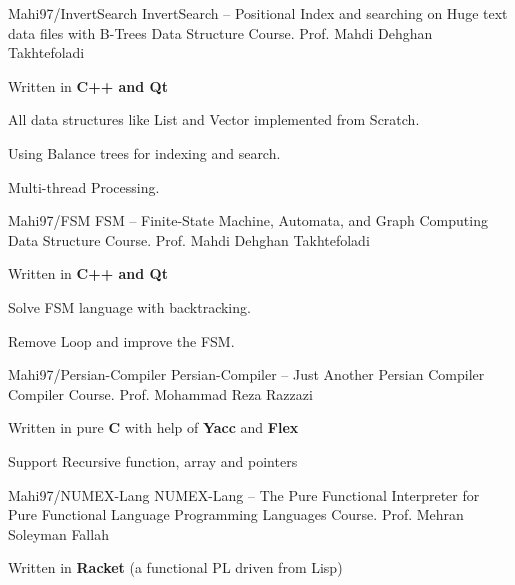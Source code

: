 \begin{cventries}
    \cventry
    {Mahi97/InvertSearch} %
    {InvertSearch -- Positional Index and searching on Huge text data files with B-Trees} %
    {Data Structure Course.} %
    {Prof. Mahdi Dehghan Takhtefoladi} %
    {
      \begin{cvitems} %
        \item {Written in \textbf{C++ and Qt}}
        \item {All data structures like List and Vector implemented from Scratch.}
        \item {Using Balance trees for indexing and search.}
        \item {Multi-thread Processing.}
      \end{cvitems}
    }
    
    \cventry
    {Mahi97/FSM} %
    {FSM -- Finite-State Machine, Automata, and Graph Computing} %
    {Data Structure Course.} %
    {Prof. Mahdi Dehghan Takhtefoladi} %
    {
      \begin{cvitems} %
        \item {Written in \textbf{C++ and Qt}}
        \item {Solve FSM language with backtracking.}
        \item {Remove Loop and improve the FSM.}
      \end{cvitems}
    }

  \cventry
    {Mahi97/Persian-Compiler} %
    {Persian-Compiler -- Just Another Persian Compiler} %
    {Compiler Course.} %
    {Prof. Mohammad Reza Razzazi} %
    {
      \begin{cvitems} %
        \item {Written in pure \textbf{C} with help of \textbf{Yacc} and \textbf{Flex}}
        \item {Support Recursive function, array and pointers}
      \end{cvitems}
    }

  \cventry
    {Mahi97/NUMEX-Lang} %
    {NUMEX-Lang -- The Pure Functional Interpreter for Pure Functional Language} %
    {Programming Languages Course.} %
    {Prof. Mehran Soleyman Fallah} %
    {
      \begin{cvitems} %
        \item {Written in \textbf{Racket} (a functional PL driven from Lisp)}
      \end{cvitems}
    }
    

\end{cventries}
